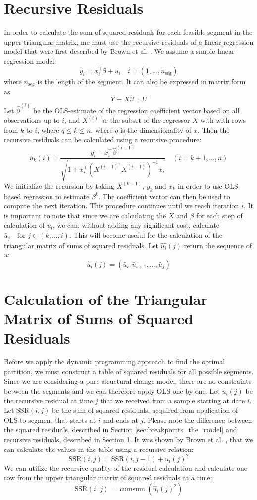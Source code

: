 \documentclass[main.tex]{subfiles}
\begin{document}
\section{Recursive Residuals}
\label{sec:recursive_residuals}
In order to calculate the sum of squared residuals for each feasible segment in
the upper-triangular matrix, me must use the recursive residuals of a linear
regression model that were first described by Brown et al. \cite{brown75}.
We assume a simple linear regression model:
\[
y_i = x_i^{\top} \beta + u_i \quad i = (1, \hdots, n_{\text{seg}})
\]
where $n_{\text{seg}}$ is the length of the segment. It can also be expressed in matrix form as:
\[
Y = X\beta + U
\]
Let $\hat{\beta}^{(i)}$ be the OLS-estimate of the regression coefficient
vector based on all observations up to $i$, and $X^{(i)}$ be the subset of the
regressor $X$ with with rows from $k$ to $i$, where $q \leq k \leq n$, where
$q$ is the dimensionality of $x$.
Then the recursive residuals can be calculated using a recursive procedure:
\[
\bar{u}_{k}(i)=\frac{y_{i}-x_{i}^{\top}
  \hat{\beta}^{(i-1)}}{\sqrt{1+x_{i}^{\top}\left(X^{(i-1)^{\top}}
    X^{(i-1)}\right)^{-1} x_{i}}} \quad(i=k+1, \ldots, n)
\]
We initialize the recursion by taking $X^{(k-1)}$, $y_{k}$ and $x_{k}$ in order to
use OLS-based regression to estimate $\beta^{k}$. The coefficient vector can
then be used to compute the next iteration. This procedure continues until we
reach iteration $i$. It is important to note that since we are calculating the $X$ and $\beta$
for each step of calculation of $\bar{u}_i$, we can, without adding any
significant cost, calculate $\bar{u}_j \quad \text{for } j \in (k, \hdots, i)$. This
will become useful for the calculation of the triangular matrix of sums of
squared residuals. Let $\hat{u_i}(j)$ return the sequence of $\bar{u}$:
\[\hat{u}_i(j) = (\bar{u}_i, \bar{u}_{i+1}, \hdots, \bar{u}_j)\]


\section{Calculation of the Triangular Matrix of Sums of Squared Residuals}
\label{sec:triangular_matrix}
Before we apply the dynamic programming approach to find the optimal
partition, we must construct a table of squared residuals for all possible
segments. Since we are considering a pure
structural change model, there are no constraints between the segments and we
can therefore apply OLS one by one. Let $u_i(j)$ be the recursive residual at
time $j$ that we received from a sample starting at date $i$.
Let $\text{SSR}(i, j)$  be the sum of squared residuals, acquired from
application of OLS to segment that starts at $i$ and ends at $j$.
Please note the difference between the squared residuals, described in Section
\ref{sec:breakpoints_the_model} and recursive residuals, described in Section
\ref{sec:recursive_residuals}. 
It was shown by Brown et al. \cite{brown75}, that we can calculate the values in
the table using a recursive relation:
\[
\text{SSR}(i,j) = \text{SSR}(i, j - 1) + \bar{u}_i(j)^2
\]
We can utilize the recursive quality of the residual calculation and calculate
one row from the upper triangular matrix of squared residuals at a time:
\[
\text{SSR}(i..j) = \operatorname{cumsum}(\hat{u}_i(j)^2)
\]
\end{document}
